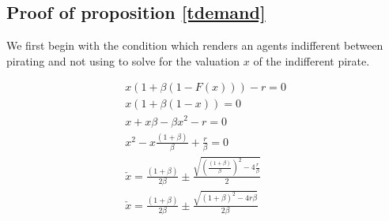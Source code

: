 \documentclass[12pt]{report}
\numberwithin{equation}{section}
\begin{document}


\subsection{Proof of proposition \ref{tdemand}}

\label{tdemandp}

We first begin with the condition which renders an agents indifferent between pirating and not using to solve for the valuation $x$ of the indifferent pirate. 


\begin{align*}
x(1+\beta(1-F(x)))-r=0 \\
x(1+\beta(1-x))=0 \\
x+x\beta-\beta x^2-r=0 \\
x^2-x\frac{(1+\beta)}{\beta} +\frac{r}{\beta} = 0 \\
\check{x} = \frac{(1+\beta)}{2 \beta}
\pm
\frac{ \sqrt{ \left(\frac{(1+\beta)}{\beta}\right)^2 -4\frac{r}{\beta} } }{2} \\
\check{x} = \frac{(1+\beta)}{2 \beta}
\pm
\frac{ \sqrt{ \left(1+\beta\right)^2 -4r\beta } }{2 \beta} \\
\end{align*}
\end{document}
